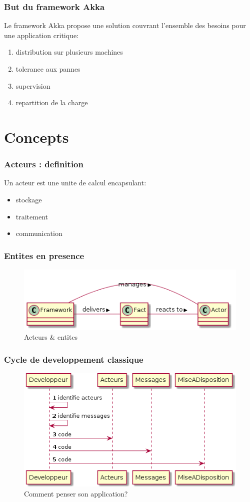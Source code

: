 \documentclass[xcolor=dvipsnames]{beamer}
\begin{document}
\begin{frame}
  \frametitle{But du framework Akka}
  Le framework Akka propose une solution couvrant l'ensemble des besoins pour une application critique:
  \begin{enumerate}
   \item distribution sur plusieurs machines
   \item  tolerance aux pannes
   \item supervision
   \item repartition de la charge
  \end{enumerate}
\end{frame}

\section{Concepts}
\begin{frame}
  \frametitle{Acteurs : definition}
  \begin{definition}
    Un acteur est une unite de calcul encapsulant:
    \begin{itemize}
   \item stockage
   \item traitement
   \item  communication
    \end{itemize}
  \end{definition}
\end{frame}

\begin{frame}[fragile]
  \frametitle{Entites en presence}
  \begin{figure}[h!]
  \caption{Acteurs \& entites}
  \centering
      \includegraphics{akka-entities}
  \end{figure}
\end{frame}

\begin{frame}[fragile]
  \frametitle{Cycle de developpement classique}
   \begin{figure}[h!]
  \caption{Comment penser son application?}
  \centering
      \includegraphics[scale=0.5]{akka-dev-cycle}
  \end{figure}
\end{frame}
\end{document}
